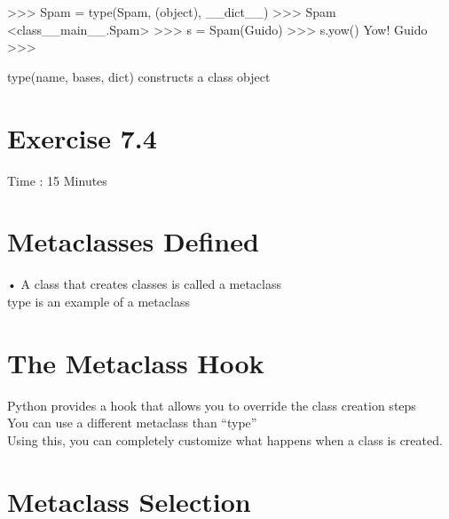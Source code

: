 \documentclass[
  letterpaper,
  DIV=11,
  numbers=noendperiod]{scrreprt}
\newenvironment{Shaded}{\begin{snugshade}}{\end{snugshade}}
\newcommand{\NormalTok}[1]{\textcolor[rgb]{0.00,0.23,0.31}{#1}}
\begin{document}
\begin{Shaded}
\begin{Highlighting}[]
\NormalTok{\textgreater{}\textgreater{}\textgreater{} Spam = type(\textquotesingle{}Spam\textquotesingle{}, (object), \_\_dict\_\_)  }
\NormalTok{\textgreater{}\textgreater{}\textgreater{} Spam  }
\NormalTok{\textless{}class\_\_main\_\_.Spam\textquotesingle{}\textgreater{}  }
\NormalTok{\textgreater{}\textgreater{}\textgreater{} s = Spam(\textquotesingle{}Guido\textquotesingle{})  }
\NormalTok{\textgreater{}\textgreater{}\textgreater{} s.yow()  }
\NormalTok{Yow! Guido  }
\NormalTok{\textgreater{}\textgreater{}\textgreater{} }
\end{Highlighting}
\end{Shaded}

type(name, bases, dict) constructs a class object


\chapter{Exercise 7.4}\label{exercise-7.4}

Time : 15 Minutes


\chapter{Metaclasses Defined}\label{metaclasses-defined}

• A class that creates classes is called a metaclass\\
type is an example of a metaclass


\chapter{The Metaclass Hook}\label{the-metaclass-hook}

Python provides a hook that allows you to override the class creation
steps\\
You can use a different metaclass than ``type''\\
Using this, you can completely customize what happens when a class is
created.


\chapter{Metaclass Selection}\label{metaclass-selection}
\end{document}
